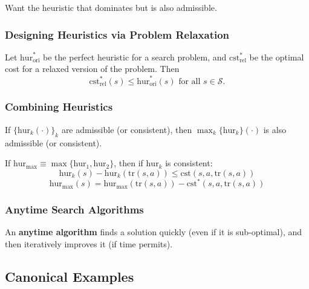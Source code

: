 \begin{notes}
    Want the heuristic that dominates but is also admissible.
\end{notes}

\subsubsection{Designing Heuristics via Problem Relaxation}
\begin{definition}
    Let $\text{hur}^*_{\text{ori}}$ be the perfect heuristic for a search problem, and $\text{cst}^*_{\text{rel}}$ be the optimal cost for a relaxed version of the problem. Then
    \[
    \text{cst}^*_{\text{rel}}(s) \leq \text{hur}^*_{\text{ori}}(s) \text{ for all } s \in \mathcal{S}.
    \]
\end{definition}

\subsubsection{Combining Heuristics}
\begin{definition}
    If $\{ \text{hur}_k(\cdot) \}_k$ are admissible (or consistent), then $\max_k \{\text{hur}_k\} (\cdot)$ is also admissible (or consistent).
\end{definition}

\begin{definition}
    If $\text{hur}_{\max} \equiv \max \{\text{hur}_1, \text{hur}_2\}$, then if $\text{hur}_k$ is consistent:
    \[
    \text{hur}_k(s) - \text{hur}_k(\text{tr}(s,a)) \leq \text{cst}(s,a,\text{tr}(s,a))
    \]
    \[
    \text{hur}_{\max} (s)= \text{hur}_{\max}(\text{tr}(s,a)) - \text{cst}^*(s,a,\text{tr}(s,a))
    \]
\end{definition}

\subsubsection{Anytime Search Algorithms}
\begin{definition}
    An \textbf{anytime algorithm} finds a solution quickly (even if it is sub-optimal), and then iteratively improves it (if time permits).
\end{definition}
\newpage

\subsection{Canonical Examples}
